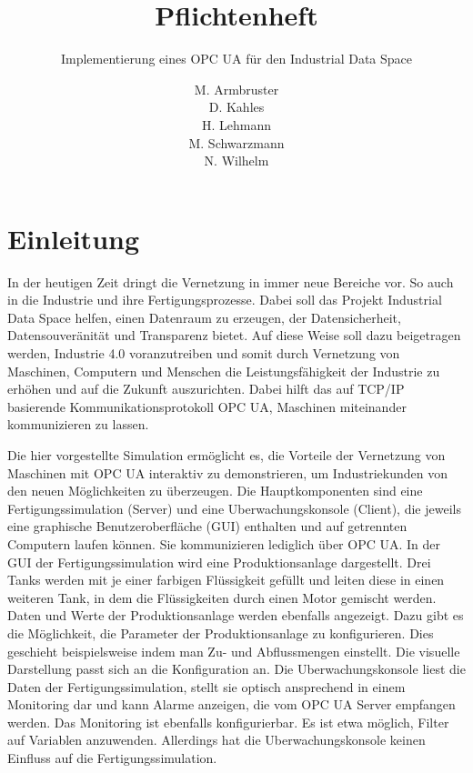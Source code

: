 \documentclass[parskip=full]{scrartcl}
\title{Pflichtenheft}
\subtitle{Implementierung eines \gls{OPC UA} \glslink{Systemadapter}{Systemadapters} für den \gls{Industrial Data Space}}
\author{
    M. Armbruster\\
    D. Kahles\\
    H. Lehmann\\
    M. Schwarzmann\\
    N. Wilhelm
}
\begin{document}
\maketitle
\pagebreak
\tableofcontents
\pagebreak

\section{Einleitung}
In der heutigen Zeit dringt die Vernetzung in immer neue Bereiche vor. So auch in die Industrie und ihre Fertigungsprozesse.
Dabei soll das Projekt \gls{Industrial Data Space} helfen, einen Datenraum zu erzeugen, der Datensicherheit, Datensouveränität und
Transparenz bietet. Auf diese Weise soll dazu beigetragen werden, Industrie 4.0 voranzutreiben und somit durch Vernetzung von
Maschinen, Computern und Menschen die Leistungsfähigkeit der Industrie zu erhöhen und auf die Zukunft auszurichten.
Dabei hilft das auf \gls{TCP/IP} basierende Kommunikationsprotokoll \gls{OPC UA}, Maschinen miteinander kommunizieren zu lassen.

Die hier vorgestellte Simulation ermöglicht es, die Vorteile der Vernetzung von Maschinen mit \gls{OPC UA} interaktiv zu demonstrieren, um Industriekunden von den neuen Möglichkeiten zu überzeugen.
Die Hauptkomponenten sind eine \gls{Fertigungssimulation} (Server) und eine \gls{Uberwachungskonsole} (Client),
die jeweils eine graphische Benutzeroberfläche (\gls{GUI}) enthalten und auf getrennten Computern laufen können.
Sie kommunizieren lediglich über \gls{OPC UA}.
In der GUI der \gls{Fertigungssimulation} wird eine \gls{Produktionsanlage} dargestellt.
Drei Tanks werden mit je einer farbigen Flüssigkeit gefüllt und leiten diese in einen weiteren Tank,
in dem die Flüssigkeiten durch einen Motor gemischt werden. Daten und Werte der \gls{Produktionsanlage} werden ebenfalls angezeigt. Dazu gibt es
die Möglichkeit, die Parameter der \gls{Produktionsanlage} zu konfigurieren. Dies geschieht beispielsweise indem man Zu- und Abflussmengen einstellt. Die visuelle Darstellung passt sich an die Konfiguration an.
Die \gls{Uberwachungskonsole} liest die Daten der \gls{Fertigungssimulation}, stellt sie optisch ansprechend in einem Monitoring dar
und kann Alarme anzeigen, die vom \gls{OPC UA} Server empfangen werden. Das Monitoring ist ebenfalls konfigurierbar. Es ist etwa möglich, Filter auf Variablen anzuwenden. Allerdings hat die \gls{Uberwachungskonsole} keinen Einfluss auf die \gls{Fertigungssimulation}.

\pagebreak
\end{document}
